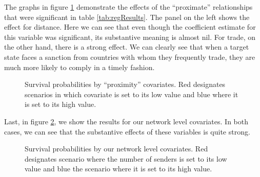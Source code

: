 The graphs in figure \ref{fig:surv2} demonstrate the effects of the ``proximate'' relationships that were significant in table \ref{tab:regResults}. The panel on the left shows the effect for distance. Here we can see that even though the coefficient estimate for this variable was significant, its substantive meaning is almost nil. For trade, on the other hand, there is a strong effect. We can clearly see that when a target state faces a sanction from countries with whom they frequently trade, they are much more likely to comply in a timely fashion.

\begin{figure}[ht]
	\centering
	\caption{Survival probabilities by ``proximity'' covariates. Red designates scenarios in which covariate is set to its low value and blue where it is set to its high value.}
	\resizebox{1\textwidth}{!}{}	
	\label{fig:surv2}
\end{figure}
\FloatBarrier

Last, in figure \ref{fig:surv3}, we show the results for our network level covariates. In both cases, we can see that the substantive effects of these variables is quite strong. 

\begin{figure}[ht]
	\centering
	\caption{Survival probabilities by our network level covariates. Red designates scenario where the number of senders is set to its low value and blue the scenario where it is set to its high value.}
	\resizebox{1\textwidth}{!}{}	
	\label{fig:surv3}	
\end{figure}
\FloatBarrier